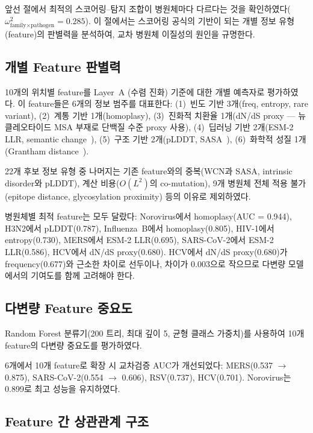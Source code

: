 앞선 절에서 최적의 스코어링--탐지 조합이 병원체마다 다르다는 것을 확인하였다($\omega^2_{\text{family}\times\text{pathogen}} = 0.285$). 이 절에서는 스코어링 공식의 기반이 되는 개별 정보 유형(feature)의 판별력을 분석하여, 교차 병원체 이질성의 원인을 규명한다.

\subsection{개별 Feature 판별력}

10개의 위치별 feature를 Layer~A (수렴 진화) 기준에 대한 개별 예측자로 평가하였다. 이 feature들은 6개의 정보 범주를 대표한다:
(1)~빈도 기반 3개(freq, entropy, rare variant),
(2)~계통 기반 1개(homoplasy),
(3)~진화적 치환율 1개(dN/dS proxy --- 뉴클레오타이드 MSA 부재로 단백질 수준 proxy 사용),
(4)~딥러닝 기반 2개(ESM-2 LLR, semantic change~\cite{hie2021learning}),
(5)~구조 기반 2개(pLDDT, SASA~\cite{shrake1973environment}),
(6)~화학적 성질 1개(Grantham distance~\cite{grantham1974amino}).

22개 후보 정보 유형 중 나머지는 기존 feature와의 중복(WCN과 SASA, intrinsic disorder와 pLDDT), 계산 비용($O(L^2)$의 co-mutation), 9개 병원체 전체 적용 불가(epitope distance, glycosylation proximity) 등의 이유로 제외하였다.

병원체별 최적 feature는 모두 달랐다: Norovirus에서 homoplasy(AUC = 0.944), H3N2에서 pLDDT(0.787), Influenza~B에서 homoplasy(0.805), HIV-1에서 entropy(0.730), MERS에서 ESM-2 LLR(0.695), SARS-CoV-2에서 ESM-2 LLR(0.586), HCV에서 dN/dS proxy(0.680). HCV에서 dN/dS proxy(0.680)가 frequency(0.677)와 근소한 차이로 선두이나, 차이가 0.003으로 작으므로 다변량 모델에서의 기여도를 함께 고려해야 한다.

\subsection{다변량 Feature 중요도}

Random Forest 분류기(200 트리, 최대 깊이 5, 균형 클래스 가중치)를 사용하여 10개 feature의 다변량 중요도를 평가하였다.

6개에서 10개 feature로 확장 시 교차검증 AUC가 개선되었다: MERS(0.537 $\rightarrow$ 0.875), SARS-CoV-2(0.554 $\rightarrow$ 0.606), RSV(0.737), HCV(0.701). Norovirus는 0.899로 최고 성능을 유지하였다.

\subsection{Feature 간 상관관계 구조}

